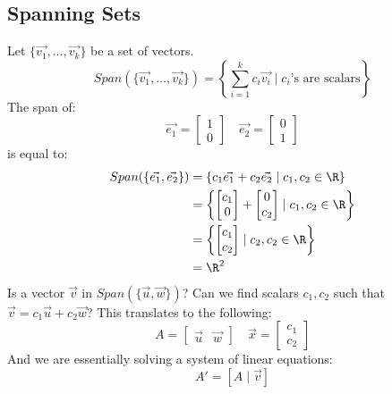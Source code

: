 \documentclass{math}
\begin{document}
\subsection*{Spanning Sets}
Let \( \{\vec{v_1},\dots,\vec{v_k}\} \) be a set of vectors.
\[ Span(\{\vec{v_1},\dots,\vec{v_k}\}) = \left\{\sum_{i=1}^{k}c_i\vec{v_i}\mid
  c_i \text{'s are scalars}\right\} \]
The span of:
\[ \vec{e_1} = \begin{bmatrix}1 \\ 0\end{bmatrix}\quad
  \vec{e_2} = \begin{bmatrix}0 \\ 1\end{bmatrix} \]
is equal to:
\begin{align*}
  Span(\{\vec{e_1},\vec{e_2}\}) &=
    \{c_1\vec{e_1}+c_2\vec{e_2}\mid c_1,c_2\in\R\} \\
  &= \left\{\begin{bmatrix}c_1 \\ 0\end{bmatrix}+
    \begin{bmatrix}0 \\ c_2\end{bmatrix}\mid c_1,c_2\in\R\right\} \\
  &= \left\{\begin{bmatrix}c_1 \\ c_2\end{bmatrix}\mid c_2,c_2\in\R\right\} \\
  &= \R^2
\end{align*}
Is a vector \( \vec{v} \) in \( Span(\{\vec{u},\vec{w}\}) \)? Can we find
scalars \( c_1,c_2 \) such that \( \vec{v} = c_1\vec{u}+c_2\vec{w} \)? This
translates to the following:
\[ A = \begin{bmatrix}\vec{u} & \vec{w}\end{bmatrix}\quad
  \vec{x} = \begin{bmatrix}c_1 \\ c_2\end{bmatrix} \]
And we are essentially solving a system of linear equations:
\[ A' = [A\mid\vec{v}] \]
\end{document}
